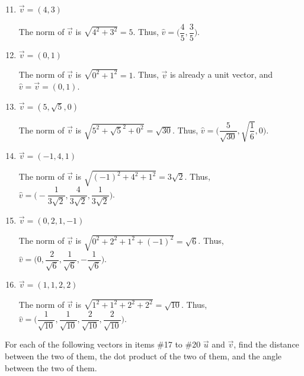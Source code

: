 \documentclass{article}
\begin{document}
\begin{enumerate}
    \setcounter{enumi}{10} 
    \item \(\overrightarrow{v} = (4,3)\)\begin{solution}
        The norm of \(\overrightarrow{v}\) is \(\sqrt{4^2 + 3^2} = 5\). Thus, \(\hat{v} = \biggl(\dfrac{4}{5}, \dfrac{3}{5}\biggl)\). 
    \end{solution}
    \item \(\overrightarrow{v} = (0,1)\)\begin{solution}
        The norm of \(\overrightarrow{v}\) is \(\sqrt{0^2 + 1^2} = 1\). Thus, \(\overrightarrow{v}\) is already a unit vector, and \(\hat{v} = \overrightarrow{v} = (0,1)\). 
    \end{solution}
    \item \(\overrightarrow{v} = (5,\sqrt{5},0)\)\begin{solution}
        The norm of \(\overrightarrow{v}\) is \(\sqrt{5^2 + {\sqrt{5}}^2 + 0^2} = \sqrt{30}\). Thus, \(\hat{v} = \biggl(\dfrac{5}{\sqrt{30}}, \sqrt{\dfrac{1}{6}}, 0\biggl)\). 
    \end{solution}
    \item \(\overrightarrow{v} = (-1,4,1)\)\begin{solution}
        The norm of \(\overrightarrow{v}\) is \(\sqrt{{(-1)}^2 + 4^2+ 1^2} = 3\sqrt{2}\). Thus, \(\hat{v} = \biggl(-\dfrac{1}{3\sqrt{2}}, \dfrac{4}{3\sqrt{2}}, \dfrac{1}{3\sqrt{2}}\biggl)\). 
    \end{solution}
    \item \(\overrightarrow{v} = (0,2,1,-1)\)\begin{solution}
        The norm of \(\overrightarrow{v}\) is \(\sqrt{0^2 + 2^2 + 1^2 + {(-1)}^2} = \sqrt{6}\). Thus, \(\hat{v} = \biggl(0, \dfrac{2}{\sqrt{6}}, \dfrac{1}{\sqrt{6}}, -\dfrac{1}{\sqrt{6}}\biggl)\). 
    \end{solution}
    \item \(\overrightarrow{v} = (1,1,2,2)\)\begin{solution}
        The norm of \(\overrightarrow{v}\) is \(\sqrt{1^2 + 1^2 + 2^2 + 2^2} = \sqrt{10}\). Thus, \(\hat{v} = \biggl(\dfrac{1}{\sqrt{10}}, \dfrac{1}{\sqrt{10}}, \dfrac{2}{\sqrt{10}}, \dfrac{2}{\sqrt{10}}\biggl)\).
    \end{solution}
\end{enumerate}
\begin{center}
    \colorbox{CornflowerBlue!50}{
    \begin{minipage}[c]{0.9\textwidth}
        \centering
        For each of the following vectors in items \#17 to \#20 \(\overrightarrow{u}\) and \(\overrightarrow{v}\), find the distance between the two of them, the dot product of the two of them, and the angle between the two of them. 
    \end{minipage}
    }
\end{center}
\end{document}
